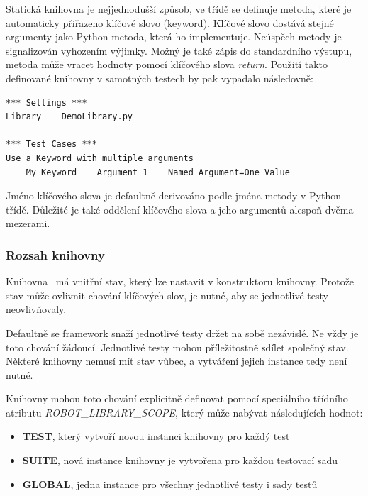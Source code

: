 Statická knihovna je nejjednodušší způsob, ve třídě se definuje metoda, které je automaticky přiřazeno klíčové slovo (keyword). Klíčové slovo dostává stejné argumenty jako Python metoda, která ho implementuje. Neúspěch metody je signalizován vyhozením výjimky. Možný je také zápis do standardního výstupu, metoda může vracet hodnoty pomocí klíčového slova \textit{return}.
Použití takto definované knihovny v samotných testech by pak vypadalo následovně:

\begin{listing}[H]
    \begin{verbatim}
*** Settings ***
Library    DemoLibrary.py

*** Test Cases ***
Use a Keyword with multiple arguments
    My Keyword    Argument 1    Named Argument=One Value
    \end{verbatim}

    \caption{Použití knihovny~\cite{robotframeworkBaseLibrary}}
    \label{list:demo-library-usage}
\end{listing}

Jméno klíčového slova je defaultně derivováno podle jména metody v Python třídě. Důležité je také oddělení klíčového slova a jeho argumentů alespoň dvěma mezerami.

\subsubsection{Rozsah knihovny}

Knihovna~\cite{robotframeworkUserGuide} má vnitřní stav, který lze nastavit v konstruktoru knihovny. Protože stav může ovlivnit chování klíčových slov, je nutné, aby se jednotlivé testy neovlivňovaly.

Defaultně se framework snaží jednotlivé testy držet na sobě nezávislé. Ne vždy je toto chování žádoucí. Jednotlivé testy mohou příležitostně sdílet společný stav. Některé knihovny nemusí mít stav vůbec, a vytváření jejich instance tedy není nutné.

Knihovny mohou toto chování explicitně definovat pomocí speciálního třídního atributu \textit{ROBOT\_LIBRARY\_SCOPE}, který může nabývat následujících hodnot:

\begin{itemize}
    \item \textbf{TEST}, který vytvoří novou instanci knihovny pro každý test
    \item \textbf{SUITE}, nová instance knihovny je vytvořena pro každou testovací sadu
    \item \textbf{GLOBAL}, jedna instance pro všechny jednotlivé testy i sady testů
\end{itemize}

